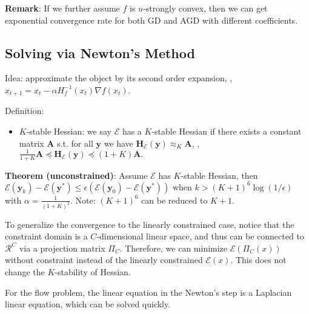 \textbf{Remark}: If we further assume $f$ is $u$-strongly convex, then we can get exponential convergence rate for both GD and AGD with different coefficients.


\subsection{Solving via Newton's Method}

Idea: approximate the object by its second order expansion, \ie, $x_{t+1} = x_t - \alpha H_f^{-1}(x_t) \nabla f(x_t)$.

Definition:
\begin{itemize}
    \item $K$-stable Hessian: we say $\mathcal{E}$ has a $K$-stable Hessian if there exists a constant matrix $\boldsymbol{A}$ s.t. for all $\boldsymbol{y}$ we have
    $
    \boldsymbol{H}_{\mathcal{E}}(\boldsymbol{y}) \approx_{K} \boldsymbol{A}$, \ie, $ \frac{1}{1+K} \boldsymbol{A} \preceq \boldsymbol{H}_{\mathcal{E}}(\boldsymbol{y}) \preceq(1+K) \boldsymbol{A} .
    $
\end{itemize}

\textbf{Theorem (unconstrained)}: Assume $\mathcal{E}$ has $K$-stable Hessian, then $\mathcal{E}\left(\boldsymbol{y}_{k}\right)-\mathcal{E}\left(\boldsymbol{y}^{*}\right) \leq \epsilon\left(\mathcal{E}\left(\boldsymbol{y}_{0}\right)-\mathcal{E}\left(\boldsymbol{y}^{*}\right)\right) \text { when } k>(K+1)^{6} \log (1 / \epsilon)$ with $\alpha = \frac{1}{(1+K)^2}$. Note: $(K+1)^6$ can be reduced to $K+1$.

To generalize the convergence to the linearly constrained case, notice that the constraint domain is a $C$-dimensional linear space, and thus can be connected to $\mathcal{R}^C$ via a projection matrix $\Pi_C$. Therefore, we can minimize $\mathcal{E}(\Pi_C(x))$ without constraint instead of the linearly constrained $\mathcal{E}(x)$. This does not change the $K$-stability of Hessian.

For the flow problem, the linear equation in the Newton's step is a Laplacian linear equation, which can be solved quickly.